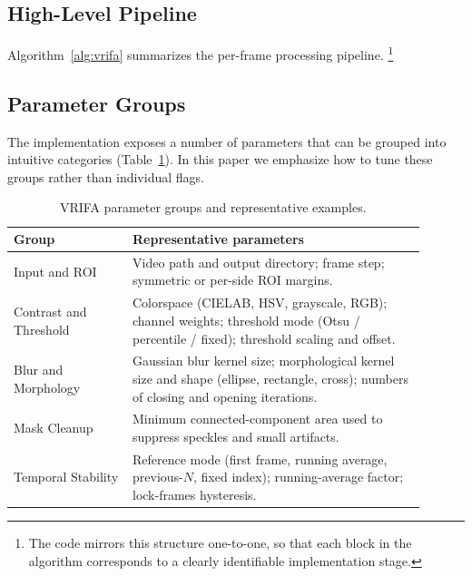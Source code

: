 \documentclass[twocolumn, 10pt]{article}
\begin{document}
\subsection{High-Level Pipeline}

Algorithm~\ref{alg:vrifa} summarizes the per-frame processing pipeline.%
\footnote{The code mirrors this structure one-to-one, so that each block in the algorithm corresponds to a clearly identifiable implementation stage.}

\begin{algorithm}[!t]
\caption{VRIFA Processing Pipeline}
\label{alg:vrifa}
\DontPrintSemicolon
\SetAlgoLined


\end{algorithm}

\subsection{Parameter Groups}

The implementation exposes a number of parameters that can be grouped into intuitive categories (Table~\ref{tab:param_groups}). In this paper we emphasize how to tune these groups rather than individual flags.

\begin{table}[!t]
    \centering
    \caption{VRIFA parameter groups and representative examples.}
    \label{tab:param_groups}
    \begin{tabular}{p{0.26\linewidth}p{0.64\linewidth}}
        \toprule
        \textbf{Group} & \textbf{Representative parameters} \\
        \midrule
        Input and ROI &
        Video path and output directory; frame step; symmetric or per-side ROI margins. \\
        Contrast and Threshold &
        Colorspace (CIELAB, HSV, grayscale, RGB); channel weights; threshold mode (Otsu / percentile / fixed); threshold scaling and offset. \\
        Blur and Morphology &
        Gaussian blur kernel size; morphological kernel size and shape (ellipse, rectangle, cross); numbers of closing and opening iterations. \\
        Mask Cleanup &
        Minimum connected-component area used to suppress speckles and small artifacts. \\
        Temporal Stability &
        Reference mode (first frame, running average, previous-$N$, fixed index); running-average factor; lock-frames hysteresis. \\
        \bottomrule
    \end{tabular}
\end{table}
\end{document}
